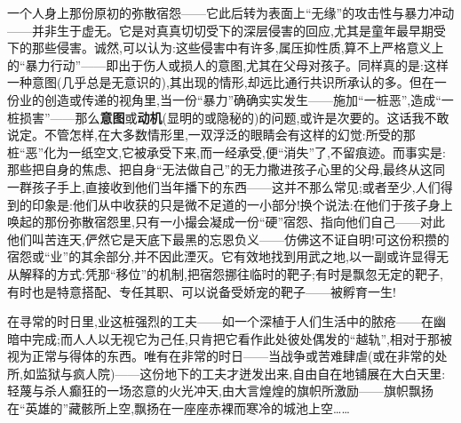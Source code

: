 一个人身上那份原初的弥散宿怨——它此后转为表面上“无缘”的攻击性与暴力冲动——并非生于虚无。它是对真真切切受下的深层侵害的回应,尤其是童年最早期受下的那些侵害。诚然,可以认为:这些侵害中有许多,属压抑性质,算不上严格意义上的“暴力行动”——即出于伤人或损人的意图,尤其在父母对孩子。同样真的是:这样一种意图(几乎总是无意识的),其出现的情形,却远比通行共识所承认的多。但在一份业的创造或传递的视角里,当一份“暴力”确确实实发生——施加“一桩恶”,造成“一桩损害”——那么\textbf{意图}或\textbf{动机}(显明的或隐秘的)的问题,或许是次要的。这话我不敢说定。不管怎样,在大多数情形里,一双浮泛的眼睛会有这样的幻觉:所受的那桩“恶”化为一纸空文,它被承受下来,而一经承受,便“消失”了,不留痕迹。而事实是:那些把自身的焦虑、把自身“无法做自己”的无力撒进孩子心里的父母,最终从这同一群孩子手上,直接收到\dmark{}他们当年播下的东西——这并不那么常见;或者至少,人们得到的印象是:他们从中收获的只是微不足道的一小部分!换个说法:在他们于孩子身上唤起的那份弥散宿怨里,只有一小撮会凝成一份“硬”宿怨、指向他们自己——对此他们叫苦连天,俨然它是天底下最黑的忘恩负义——仿佛这不证自明!可这份积攒的宿怨或“业”的其余部分,并不因此湮灭。它有效地找到用武之地,以一副或许显得无从解释的方式:凭那“移位”的机制,把宿怨挪往临时的靶子;有时是飘忽无定的靶子,有时也是特意搭配、专任其职、可以说备受娇宠的靶子——被孵育一生!

在寻常的时日里,业这桩强烈的工夫——如一个深植于人们生活中的脓疮——在幽暗中完成;而人人以无视它为己任,只肯把它看作此处彼处偶发的“越轨”,相对于那被视为正常与得体的东西。唯有在非常的时日——当战争或苦难肆虐(或在非常的处所,如监狱与疯人院)——这份地下的工夫才迸发出来,自由自在地铺展在大白天里:轻蔑与杀人癫狂的一场恣意的火光冲天,由大言煌煌的旗帜所激励——旗帜飘扬在“英雄的”藏骸所上空,飘扬在一座座赤裸而寒冷的城池上空……

